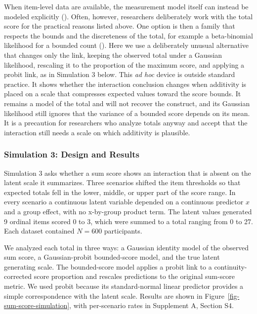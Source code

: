 \documentclass[
  man,
  floatsintext,
  longtable,
  nolmodern,
  notxfonts,
  notimes,
  colorlinks=true,linkcolor=blue,citecolor=blue,urlcolor=blue]{apa7}
\begin{document}
When item-level data are available, the measurement model itself can
instead be modeled explicitly (). Often, however, researchers deliberately work with
the total score for the practical reasons listed above. One option is
then a family that respects the bounds and the discreteness of the
total, for example a beta-binomial likelihood for a bounded count
(). Here we use a deliberately
unusual alternative that changes only the link, keeping the observed
total under a Gaussian likelihood, rescaling it to the proportion of the
maximum score, and applying a probit link, as in Simulation 3 below.
This \emph{ad hoc} device is outside standard practice. It shows whether
the interaction conclusion changes when additivity is placed on a scale
that compresses expected values toward the score bounds. It remains a
model of the total and will not recover the construct, and its Gaussian
likelihood still ignores that the variance of a bounded score depends on
its mean. It is a precaution for researchers who analyze totals anyway
and accept that the interaction still needs a scale on which additivity
is plausible.

\subsubsection{Simulation 3: Design and
Results}\label{simulation-3-design-and-results}

Simulation 3 asks whether a sum score shows an interaction that is
absent on the latent scale it summarizes. Three scenarios shifted the
item thresholds so that expected totals fell in the lower, middle, or
upper part of the score range. In every scenario a continuous latent
variable depended on a continuous predictor \(x\) and a group effect,
with no x-by-group product term. The latent values generated 9 ordinal
items scored 0 to 3, which were summed to a total ranging from 0 to 27.
Each dataset contained \(N = 600\) participants.

We analyzed each total in three ways: a Gaussian identity model of the
observed sum score, a Gaussian-probit bounded-score model, and the true
latent generating scale. The bounded-score model applies a probit link
to a continuity-corrected score proportion and rescales predictions to
the original sum-score metric. We used probit because its
standard-normal linear predictor provides a simple correspondence with
the latent scale. Results are shown in
Figure~\ref{fig-sum-score-simulation}, with per-scenario rates in
Supplement A, Section S4.
\end{document}
